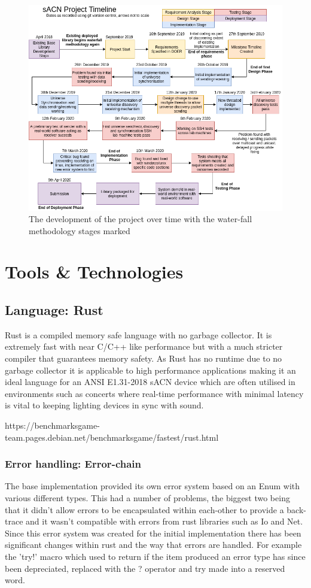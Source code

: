 \documentclass[11pt,a4paper]{article}
\begin{document}
\begin{figure}[H]
\label{project_dev_timeline}
\includegraphics[width=\textwidth]{CS4099-dev-timeline}
\caption{The development of the project over time with the water-fall methodology stages marked}
\end{figure}


\section{Tools \& Technologies}
\subsection{Language: Rust}
Rust \cite{RUST_LANG} is a compiled memory safe language with no garbage collector. It is extremely fast with near C/C++ like performance \cite{RUST_C_COMPARISON} but with a much stricter compiler that guarantees memory safety. As Rust has no runtime due to no garbage collector it is applicable to high performance applications making it an ideal language for an ANSI E1.31-2018 sACN device which are often utilised in environments such as concerts where real-time performance with minimal latency is vital to keeping lighting devices in sync with sound.

https://benchmarksgame-team.pages.debian.net/benchmarksgame/fastest/rust.html

\subsubsection{Error handling: Error-chain}
The base implementation provided its own error system based on an Enum with various different types. This had a number of problems, the biggest two being that it didn't allow errors to be encapsulated within each-other to provide a back-trace and it wasn't compatible with errors from rust libraries such as Io and Net. Since this error system was created for the initial implementation there has been significant changes within rust and the way that errors are handled. For example the 'try!' \cite{RUST_TRY} macro which used to return if the item produced an error type has since been depreciated, replaced with the ? operator and try made into a reserved word.\\
\end{document}
